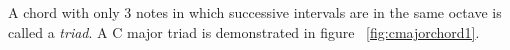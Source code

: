 A chord with only 3 notes in which successive intervals are in the same octave is called a \textit{triad}. A C major triad is demonstrated in figure ~\ref{fig:cmajorchord1}.



